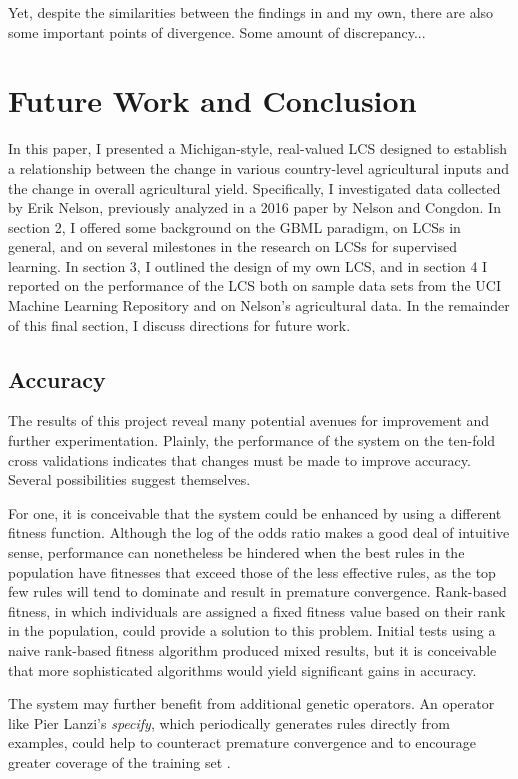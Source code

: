 \documentclass[11pt]{article}
\begin{document}
Yet, despite the similarities between the findings in \cite{nelson_measuring_2016} and my own, there are also some important points of divergence. Some amount of discrepancy...

\section{Future Work and Conclusion}

In this paper, I presented a Michigan-style, real-valued LCS designed to establish a relationship between the change in various country-level agricultural inputs and the change in overall agricultural yield. Specifically, I investigated data collected by Erik Nelson, previously analyzed in a 2016 paper by Nelson and Congdon. In section 2, I offered some background on the GBML paradigm, on LCSs in general, and on several milestones in the research on LCSs for supervised learning. In section 3, I outlined the design of my own LCS, and in section 4 I reported on the performance of the LCS both on sample data sets from the UCI Machine Learning Repository and on Nelson's agricultural data. In the remainder of this final section, I discuss directions for future work.

\subsection{Accuracy}
The results of this project reveal many potential avenues for improvement and further experimentation. Plainly, the performance of the system on the ten-fold cross validations indicates that changes must be made to improve accuracy. Several possibilities suggest themselves. 

For one, it is conceivable that the system could be enhanced by using a different fitness function. Although the log of the odds ratio makes a good deal of intuitive sense, performance can nonetheless be hindered when the best rules in the population have fitnesses that exceed those of the less effective rules, as the top few rules will tend to dominate and result in premature convergence. Rank-based fitness, in which individuals are assigned a fixed fitness value based on their rank in the population, could provide a solution to this problem. Initial tests using a naive rank-based fitness algorithm produced mixed results, but it is conceivable that more sophisticated algorithms would yield significant gains in accuracy.

The system may further benefit from additional genetic operators. An operator like Pier Lanzi's \emph{specify}, which periodically generates rules directly from examples, could help to counteract premature convergence and to encourage greater coverage of the training set \cite{lanzi_study_1997}.
\end{document}
